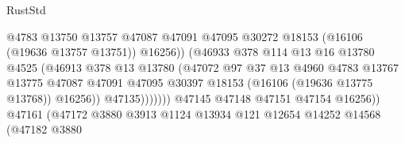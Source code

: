 \begin{lexlean}{RustStd}
\begin{coremodule}
                                              @4783
                                              @13750
                                              @13757
                                              @47087
                                              @47091
                                              @47095
                                              @30272
                                              @18153
                                              (@16106 (@19636 @13757 @13751))
                                              @16256))
                                          (@46933
                                            @378
                                            @114
                                            @13
                                            @16
                                            @13780
                                            @4525
                                            (@46913
                                              @378
                                              @13
                                              @13780
                                              (@47072
                                                @97
                                                @37
                                                @13
                                                @4960
                                                @4783
                                                @13767
                                                @13775
                                                @47087
                                                @47091
                                                @47095
                                                @30397
                                                @18153
                                                (@16106 (@19636 @13775 @13768))
                                                @16256))
                                            @47135)))))))
                              @47145
                              @47148
                              @47151
                              @47154
                              @16256))
                          @47161
                          (@47172
                            @3880
                            @3913
                            @1124
                            @13934
                            @121
                            @12654
                            @14252
                            @14568
                            (@47182
                              @3880

\end{coremodule}
\end{lexlean}
